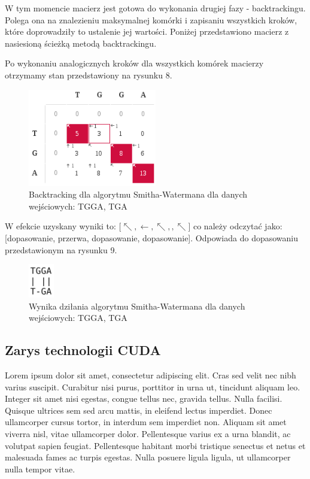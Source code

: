\documentclass[a4paper,12pt]{article}
\begin{document}
W tym momencie macierz jest gotowa do wykonania drugiej fazy - backtrackingu. Polega ona na znalezieniu maksymalnej komórki i zapisaniu wszystkich kroków, które doprowadziły to ustalenie jej wartości. Poniżej przedstawiono macierz z nasiesioną ścieżką metodą backtrackingu. 

Po wykonaniu analogicznych kroków dla wszystkich komórek macierzy otrzymamy stan przedstawiony na rysunku 8.
\begin{figure}[h]
  \vspace{5pt}
  \centering
  \begin{center}
  \includegraphics[width=0.5\textwidth]{images/SchematDzialaniaAlgorytmuPelnaMacierzBacktracking.png}
  \end{center}
  \caption{Backtracking dla algorytmu Smitha-Watermana dla danych wejściowych: TGGA, TGA}
 \end{figure}

W efekcie uzyskany wyniki to: [$\nwarrow, \leftarrow, \nwarrow, , \nwarrow$] co należy odczytać jako: [dopasowanie, przerwa, dopasowanie, dopasowanie]. 
Odpowiada do dopasowaniu przedstawionym na rysunku 9. 
\begin{figure}[h]
  \vspace{5pt}
  \centering
  \begin{center}
  \includegraphics[width=0.1\textwidth]{images/uzyskaneDopasowanie.png}
  \end{center}
  \caption{Wynika dziłania algorytmu Smitha-Watermana dla danych wejściowych: TGGA, TGA}
 \end{figure}

\subsection*{Zarys technologii CUDA}
Lorem ipsum dolor sit amet, consectetur adipiscing elit. Cras sed velit nec nibh varius suscipit. Curabitur nisi purus, porttitor in urna ut, tincidunt aliquam leo. Integer sit amet nisi egestas, congue tellus nec, gravida tellus. Nulla facilisi. Quisque ultrices sem sed arcu mattis, in eleifend lectus imperdiet. Donec ullamcorper cursus tortor, in interdum sem imperdiet non. Aliquam sit amet viverra nisl, vitae ullamcorper dolor. Pellentesque varius ex a urna blandit, ac volutpat sapien feugiat. Pellentesque habitant morbi tristique senectus et netus et malesuada fames ac turpis egestas. Nulla posuere ligula ligula, ut ullamcorper nulla tempor vitae.
\end{document}
